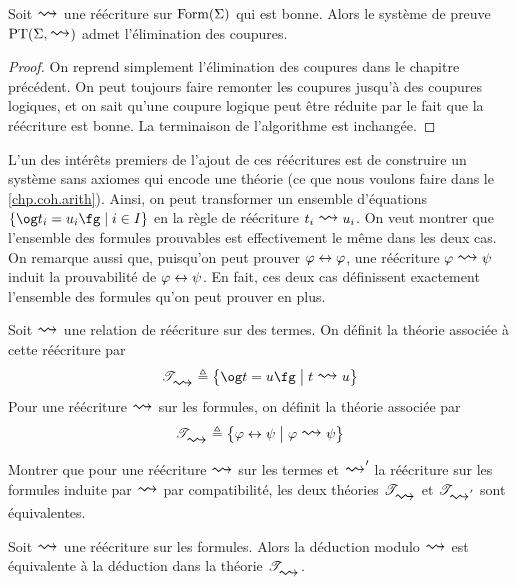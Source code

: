 \begin{theorem}\label{thm.cutElimModTh}
  Soit $\reecr{}$ une réécriture sur $\operatorname{Form}(\Sigma)$ qui
  est bonne. Alors le système de preuve
  $\Proof(\Sign,\reecr{})$ admet l'élimination des coupures.
\end{theorem}

\begin{proof}
  On reprend simplement l'élimination des coupures dans
  le chapitre précédent. On peut toujours faire remonter
  les coupures jusqu'à des coupures logiques, et on sait
  qu'une coupure logique peut être réduite par le fait
  que la réécriture est bonne. La terminaison de l'algorithme
  est inchangée.
\end{proof}

L'un des intérêts premiers de l'ajout de ces réécritures est de
construire un système sans axiomes qui encode une théorie (ce que
nous voulons faire dans le \cref{chp.coh.arith}). Ainsi, on peut
transformer un ensemble d'équations $\compr{\ogM t_i = u_i\fgM}{i \in I}$
en la règle de réécriture $t_i \reecr{} u_i$. On veut montrer
que l'ensemble des formules prouvables est effectivement le même
dans les deux cas. On remarque aussi que, puisqu'on peut
prouver $\varphi \mathrel{\leftrightarrow} \varphi$, une réécriture
$\varFF\reecr{} \varFP$ induit la prouvabilité de
$\varphi\mathrel{\leftrightarrow} \psi$. En fait, ces deux cas définissent
exactement l'ensemble des formules qu'on peut prouver en plus.

\begin{definition}
  Soit $\reecr{}$ une relation de réécriture sur des termes.
  On définit la théorie associée à cette réécriture par
  \[\varT_{\reecr{}} \defeq
  \compr{\ogM t = u\fgM}{t\reecr{} u} \]
  Pour une réécriture $\reecr{}$ sur les formules, on définit
  la théorie associée par
  \[\varT_{\reecr{}} \defeq
  \compr{\varFF\iffS\varFP}{\varFF\reecr{}\varFP}\]
\end{definition}

\begin{exercise}
  Montrer que pour une réécriture $\reecr{}$ sur les termes
  et $\reecr{}'$ la réécriture sur les formules induite par
  $\reecr{}$ par compatibilité, les deux théories
  $\varT_{\reecr{}}$ et $\varT_{\reecr{}'}$ sont
  équivalentes.
\end{exercise}

\begin{theorem}\label{thm.ReecrThModTh}
  Soit $\reecr{}$ une réécriture sur les formules. Alors la
  déduction modulo $\reecr{}$ est équivalente à la déduction
  dans la théorie $\varT_{\reecr{}}$.
\end{theorem}

